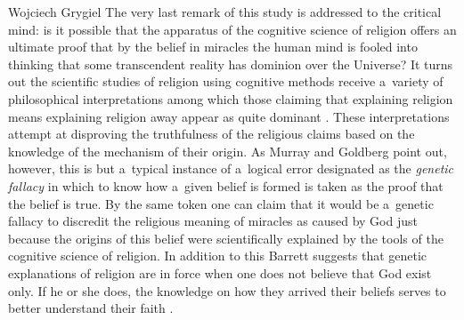 \begin{artengenv}{Wojciech Grygiel}
The very last remark of this study is addressed to the critical mind: is it possible that the apparatus of the cognitive science of religion offers an ultimate proof that by the belief in miracles the human mind is fooled into thinking that some transcendent reality has dominion over the Universe? It turns out the scientific studies of religion using cognitive methods receive a~variety of philosophical interpretations among which those claiming that explaining religion means explaining religion away appear as quite dominant
\parencites[e.g.][p.76]{boyer_religion_2001}[][pp.78–79]{pyysiainen_cognition_2001}. %
 These interpretations attempt at disproving the truthfulness of the religious claims based on the knowledge of the mechanism of their origin. As Murray and Goldberg 
\parencite*[][pp.193–199]{murray_evolutionary_2010} %
 point out, however, this is but a~typical instance of a~logical error designated as the \textit{genetic fallacy} in which to know how a~given belief is formed is taken as the proof that the belief is true. By the same token one can claim that it would be a~genetic fallacy to discredit the religious meaning of miracles as caused by God just because the origins of this belief were scientifically explained by the tools of the cognitive science of religion. In addition to this Barrett suggests that genetic explanations of religion are in force when one does not believe that God exist only. If he or she does, the knowledge on how they arrived their beliefs serves to better understand their faith 
\parencites[][pp.148–155]{barrett_cognitive_2011}[see also][pp.51–54]{wszolek_wprowadzenie_2004}.%


\end{artengenv}
